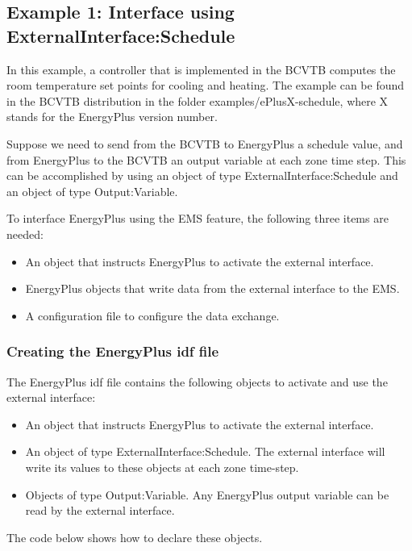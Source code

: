 \subsection{Example 1: Interface using ExternalInterface:Schedule}\label{example-1-interface-using-externalinterfaceschedule}

In this example, a controller that is implemented in the BCVTB computes the room temperature set points for cooling and heating. The example can be found in the BCVTB distribution in the folder examples/ePlusX-schedule, where X stands for the EnergyPlus version number.

Suppose we need to send from the BCVTB to EnergyPlus a schedule value, and from EnergyPlus to the BCVTB an output variable at each zone time step. This can be accomplished by using an object of type ExternalInterface:Schedule and an object of type Output:Variable.

To interface EnergyPlus using the EMS feature, the following three items are needed:

\begin{itemize}
\item
  An object that instructs EnergyPlus to activate the external interface.
\item
  EnergyPlus objects that write data from the external interface to the EMS.
\item
  A configuration file to configure the data exchange.
\end{itemize}

\subsubsection{Creating the EnergyPlus idf file}\label{creating-the-energyplus-idf-file}

The EnergyPlus idf file contains the following objects to activate and use the external interface:

\begin{itemize}
\item
  An object that instructs EnergyPlus to activate the external interface.
\item
  An object of type ExternalInterface:Schedule. The external interface will write its values to these objects at each zone time-step.
\item
  Objects of type Output:Variable. Any EnergyPlus output variable can be read by the external interface.
\end{itemize}

The code below shows how to declare these objects.

